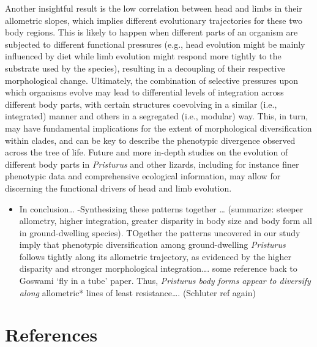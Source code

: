 \documentclass[
  11pt,
]{article}
\providecommand{\tightlist}{%
  \setlength{\itemsep}{0pt}\setlength{\parskip}{0pt}}
\begin{document}
Another insightful result is the low correlation between head and limbs
in their allometric slopes, which implies different evolutionary
trajectories for these two body regions. This is likely to happen when
different parts of an organism are subjected to different functional
pressures (e.g., head evolution might be mainly influenced by diet while
limb evolution might respond more tightly to the substrate used by the
species), resulting in a decoupling of their respective morphological
change. Ultimately, the combination of selective pressures upon which
organisms evolve may lead to differential levels of integration across
different body parts, with certain structures coevolving in a similar
(i.e., integrated) manner and others in a segregated (i.e., modular)
way. This, in turn, may have fundamental implications for the extent of
morphological diversification within clades, and can be key to describe
the phenotypic divergence observed across the tree of life. Future and
more in-depth studies on the evolution of different body parts in
\emph{Pristurus} and other lizards, including for instance finer
phenotypic data and comprehensive ecological information, may allow for
discerning the functional drivers of head and limb evolution.

\begin{itemize}
\tightlist
\item
  In conclusion\ldots{} -Synthesizing these patterns together \ldots{}
  (summarize: steeper allometry, higher integration, greater disparity
  in body size and body form all in ground-dwelling species). TOgether
  the patterns uncovered in our study imply that phenotypic
  diversification among ground-dwelling \emph{Pristurus} follows tightly
  along its allometric trajectory, as evidenced by the higher disparity
  and stronger morphological integration\ldots. some reference back to
  Goswami `fly in a tube' paper. Thus, \emph{Pristurus body forms appear
  to diversify along }allometric* lines of least resistance\ldots.
  (Schluter ref again)
\end{itemize}

\newpage

\hypertarget{references}{%
\section*{References}\label{references}}

\setlength{\parindent}{-0.25in} \setlength{\leftskip}{0.25in}
\setlength{\parskip}{8pt} \noindent
\end{document}
